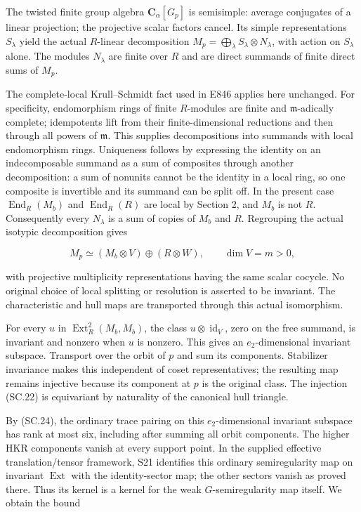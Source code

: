 The twisted finite group algebra \(\mathbf C_\alpha[G_p]\) is semisimple: average
conjugates of a linear projection; the projective scalar factors cancel.
Its simple representations \(S_\lambda\) yield the actual \(R\)-linear decomposition
\(M_p=\bigoplus_\lambda S_\lambda\otimes N_\lambda\), with action on \(S_\lambda\) alone.
The modules \(N_\lambda\) are finite over \(R\) and are direct summands of finite
direct sums of \(M_p\).

The complete-local Krull--Schmidt fact used in E846 applies here unchanged.
For specificity, endomorphism rings of finite \(R\)-modules are finite and
\(\mathfrak m\)-adically complete; idempotents lift from their finite-dimensional
reductions and then through all powers of \(\mathfrak m\). This supplies decompositions
into summands with local endomorphism rings. Uniqueness follows by
expressing the identity on an indecomposable summand as a sum of composites
through another decomposition: a sum of nonunits cannot be the identity
in a local ring, so one composite is invertible and its summand can be
split off. In the present case \(\operatorname{End}_R(M_b)\) and \(\operatorname{End}_R(R)\) are local by
Section 2, and \(M_b\) is not \(R\). Consequently every \(N_\lambda\) is a sum of
copies of \(M_b\) and \(R\). Regrouping the actual isotypic decomposition gives

\[
 M_p\simeq(M_b\otimes V)\oplus(R\otimes W),
 \qquad \dim V=m>0,
 \tag{SC.25}
\]

with projective multiplicity representations having the same scalar
cocycle. No original choice of local splitting or resolution is asserted
to be invariant. The characteristic and hull maps are transported through
this actual isomorphism.

For every \(u\) in \(\operatorname{Ext}^2_R(M_b,M_b)\), the class \(u\otimes\operatorname{id}_V\), zero on
the free summand, is invariant and nonzero when \(u\) is nonzero. This gives
an \(e_2\)-dimensional invariant subspace. Transport over the orbit of \(p\)
and sum its components. Stabilizer invariance makes this independent
of coset representatives; the resulting map remains injective because
its component at \(p\) is the original class. The injection (SC.22) is
equivariant by naturality of the canonical hull triangle.

By (SC.24), the ordinary trace pairing on this \(e_2\)-dimensional invariant
subspace has rank at most six, including after summing all orbit components.
The higher HKR components vanish at every support point. In the supplied
effective translation/tensor framework, S21 identifies this ordinary
semiregularity map on invariant \(\operatorname{Ext}\) with the identity-sector map; the
other sectors vanish as proved there. Thus its kernel is a kernel for
the weak \(G\)-semiregularity map itself. We obtain the bound

